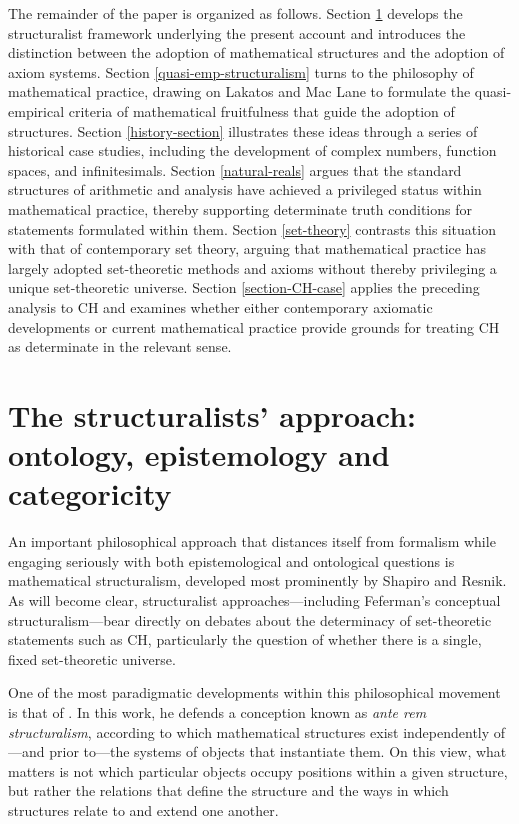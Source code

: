 \documentclass[11pt,a4paper]{article}
\begin{document}
The remainder of the paper is organized as follows. Section \ref{structuralims-ontology-epistemology} develops the structuralist framework underlying the present account and introduces the distinction between the adoption of mathematical structures and the adoption of axiom systems. Section \ref{quasi-emp-structuralism} turns to the philosophy of mathematical practice, drawing on Lakatos and Mac Lane to formulate the quasi-empirical criteria of mathematical fruitfulness that guide the adoption of structures. Section \ref{history-section} illustrates these ideas through a series of historical case studies, including the development of complex numbers, function spaces, and infinitesimals. Section \ref{natural-reals} argues that the standard structures of arithmetic and analysis have achieved a privileged status within mathematical practice, thereby supporting determinate truth conditions for statements formulated within them. Section \ref{set-theory} contrasts this situation with that of contemporary set theory, arguing that mathematical practice has largely adopted set-theoretic methods and axioms without thereby privileging a unique set-theoretic universe. Section \ref{section-CH-case} applies the preceding analysis to $\mathrm{CH}$ and examines whether either contemporary axiomatic developments or current mathematical practice provide grounds for treating $\mathrm{CH}$ as determinate in the relevant sense.

\section{The structuralists' approach: ontology, epistemology and categoricity}
\label{structuralims-ontology-epistemology}
 
An important philosophical approach that distances itself from formalism while engaging seriously with both epistemological and ontological questions is mathematical structuralism, developed most prominently by Shapiro and Resnik. As will become clear, structuralist approaches---including Feferman's conceptual structuralism---bear directly on debates about the determinacy of set-theoretic statements such as CH, particularly the question of whether there is a single, fixed set-theoretic universe.

One of the most paradigmatic developments within this philosophical movement is that of \textcite{Shapiro1997}. In this work, he defends a conception known as \textit{ante rem structuralism}, according to which mathematical structures exist independently of—and prior to—the systems of objects that instantiate them. On this view, what matters is not which particular objects occupy positions within a given structure, but rather the relations that define the structure and the ways in which structures relate to and extend one another.
\end{document}
